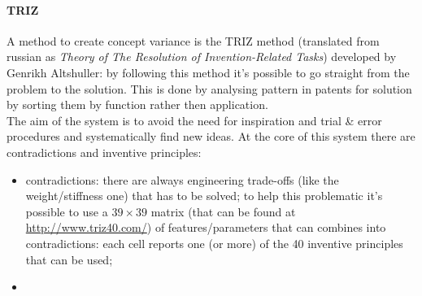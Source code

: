 		\paragraph{TRIZ} A method to create concept variance is the TRIZ method (translated from russian as \textit{Theory of The Resolution of Invention-Related Tasks}) developed by Genrikh Altshuller: by following this method it's possible to go straight from the problem to the solution. This is done by analysing pattern in patents for solution by sorting them by function rather then application.	\\
		The aim of the system is to avoid the need for inspiration and trial \& error procedures and systematically find new ideas. At the core of this system there are contradictions and inventive principles:
		\begin{itemize}
			\item contradictions: there are always engineering trade-offs (like the weight/stiffness one) that has to be solved; to help this problematic it's possible to use a $39\times 39$ matrix (that can be found at \url{http://www.triz40.com/}) of features/parameters that can combines into contradictions: each cell reports one (or more) of the 40 inventive principles that can be used;
			
			\item 
		\end{itemize}
		
		
	
